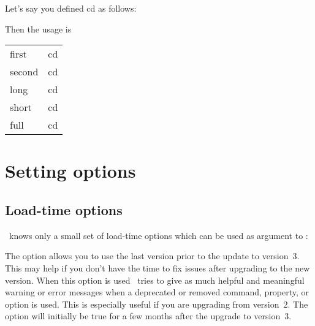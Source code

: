 \documentclass{acro-manual}
\begin{document}
Let's say you defined \acs*{cd} as follows:
\begin{sourcecode}
\end{sourcecode}
Then the usage is
\begin{example}
  \begin{tabular}{ll}
    first  & \ac{cd} \\
    second & \ac{cd} \\
    long   & \acl{cd} \\
    short  & \acs{cd} \\
    full   & \acf{cd}
  \end{tabular}
\end{example}

\section{Setting options}\label{sec:setting-options}
\subsection{Load-time options}\label{sec:load-time-options}
\acro\ knows only a small set of load-time options which can be used as
argument to :
\begin{options}
    The option allows you to use the last version prior to the update to
    version~3.  This may help if you don't have the time to fix issues after
    upgrading to the new version.
    When this option is used \acro\ tries to give as much helpful and
    meaningful warning or error messages when a deprecated or removed command,
    property, or option is used.  This is especially useful if you are
    upgrading from version~2.  The option will initially be true for a few
    months after the upgrade to version~3.
\end{options}
\end{document}
